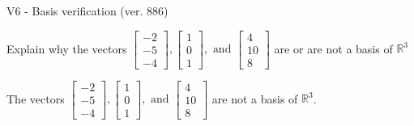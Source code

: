 \begin{exercise}
  \begin{exerciseTitle}V6 - Basis verification (ver. 886)\end{exerciseTitle}
  \begin{exerciseStatement}
    Explain why the vectors \(\left[\begin{array}{r}
-2 \\
-5 \\
-4
\end{array}\right] , \left[\begin{array}{r}
1 \\
0 \\
1
\end{array}\right] , \text{ and } \left[\begin{array}{r}
4 \\
10 \\
8
\end{array}\right]\) are or are not a basis of \(\mathbb{R}^3\)	


  \end{exerciseStatement}
  \begin{exerciseAnswer}
   The vectors \(\left[\begin{array}{r}
-2 \\
-5 \\
-4
\end{array}\right] , \left[\begin{array}{r}
1 \\
0 \\
1
\end{array}\right] , \text{ and } \left[\begin{array}{r}
4 \\
10 \\
8
\end{array}\right]\) 
  	 are not  a basis of \(\mathbb{R}^3\).
  


  \end{exerciseAnswer}
\end{exercise}